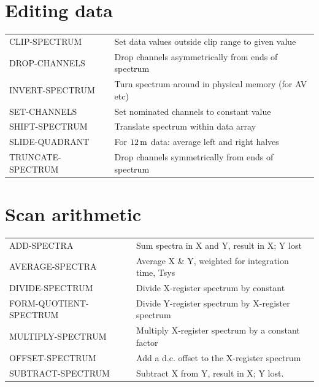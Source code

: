 \documentclass[11pt,twoside]{report}
\newcommand{\m}{{\rm\,m}}
\begin{document}
\section{Editing data} 

\begin{tabular}{ll}
CLIP-SPECTRUM            & Set data values outside clip range to given value\\
DROP-CHANNELS            & Drop channels asymmetrically from ends of spectrum\\
INVERT-SPECTRUM          & Turn spectrum around in physical memory (for AV etc)\\
SET-CHANNELS             & Set nominated channels to constant value\\
SHIFT-SPECTRUM           & Translate spectrum within data array\\
SLIDE-QUADRANT           & For $12\m$ data: average left and right halves\\
TRUNCATE-SPECTRUM        & Drop channels symmetrically from ends of spectrum\\
\end{tabular}

\section{Scan arithmetic} 

\begin{tabular}{ll}
ADD-SPECTRA              & Sum spectra in X and Y, result in X; Y lost\\
AVERAGE-SPECTRA          & Average X \& Y, weighted for integration time, Tsys\\
DIVIDE-SPECTRUM          & Divide X-register spectrum by constant\\
FORM-QUOTIENT-SPECTRUM   & Divide Y-register spectrum by X-register spectrum\\
MULTIPLY-SPECTRUM        & Multiply X-register spectrum by a constant factor\\
OFFSET-SPECTRUM          & Add a d.c. offset to the X-register spectrum\\
SUBTRACT-SPECTRUM         & Subtract X from Y, result in X; Y lost.\\
\end{tabular}
\end{document}
